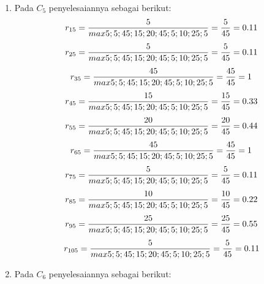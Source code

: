 \documentclass[a4paper,twoside]{article}
\begin{document}
\begin{enumerate}
\begin{enumerate}
\item Pada $C_{5}$ penyelesaiannya sebagai berikut:
\begin{displaymath}
r_{15} = \frac{5}{max {5;5;45;15;20;45;5;10;25;5}} = \frac{5}{45} = 0.11\\
\end {displaymath}
\begin{displaymath}
r_{25} = \frac{5}{max {5;5;45;15;20;45;5;10;25;5}} = \frac{5}{45} = 0.11\\
\end{displaymath}
\begin{displaymath}
r_{35} = \frac{45}{max {5;5;45;15;20;45;5;10;25;5}} = \frac{45}{45} = 1\\
\end {displaymath}
\begin{displaymath}
r_{45} = \frac{15}{max {5;5;45;15;20;45;5;10;25;5}} = \frac{15}{45} = 0.33\\
\end {displaymath}
\begin{displaymath}
r_{55} = \frac{20}{max {5;5;45;15;20;45;5;10;25;5}} = \frac{20}{45} = 0.44\\
\end {displaymath}
\begin{displaymath}
r_{65} = \frac{45}{max {5;5;45;15;20;45;5;10;25;5}} = \frac{45}{45} = 1\\
\end {displaymath}
\begin{displaymath}
r_{75} = \frac{5}{max {5;5;45;15;20;45;5;10;25;5}} = \frac{5}{45} = 0.11\\
\end {displaymath}
\begin{displaymath}
r_{85} = \frac{10}{max {5;5;45;15;20;45;5;10;25;5}} = \frac{10}{45} = 0.22\\
\end {displaymath}
\begin{displaymath}
r_{95} = \frac{25}{max {5;5;45;15;20;45;5;10;25;5}} = \frac{25}{45} = 0.55\\
\end {displaymath}
\begin{displaymath}
r_{105} = \frac{5}{max {5;5;45;15;20;45;5;10;25;5}} = \frac{5}{45} = 0.11\\
\end {displaymath}
\item Pada $C_{6}$ penyelesaiannya sebagai berikut:
\begin{displaymath}

\end{displaymath}
\end{enumerate}
\end{enumerate}
\end{document}
